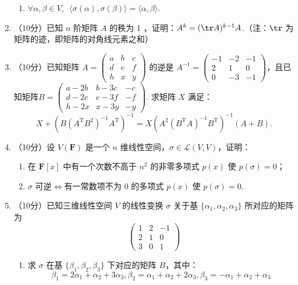 \begin{enumerate}
\begin{enumerate}
        \item $\forall \alpha,\beta \in V,\enspace \langle\sigma (\alpha),\sigma (\beta)\rangle=\langle\alpha,\beta\rangle$.
    \end{enumerate}
	\item （10分）已知 $n$ 阶矩阵 $A$ 的秩为 1 ，证明：$A^k=(\tr A)^{k-1}A$.（注：$\tr$ 为矩阵的迹，即矩阵的对角线元素之和）
	\item （10分）已知矩阵 $A=\begin{pmatrix}a & b & c \\ d & e & f \\ h & x & y\end{pmatrix}$ 的逆是 $A^{-1}=\begin{pmatrix}-1 & -2 & -1 \\ 2 & 1 & 0 \\ 0 & -3 & -1\end{pmatrix}$，且已知矩阵$B=\begin{pmatrix}a-2b & b-3c & -c \\ d-2e & e-3f & -f \\ h-2x & x-3y & -y\end{pmatrix}$. 求矩阵 $X$ 满足：
    \[X+(B(A^\mathrm{T}B^2)^{-1}A^\mathrm{T})^{-1}=X(A^2(B^\mathrm{T}A)^{-1}B^\mathrm{T})^{-1}(A+B).\]
	\item （10分）设 $V(\mathbf{F})$ 是一个 $n$ 维线性空间，$\sigma \in \mathcal{L}(V,V)$，证明：
    \begin{enumerate}
        \item 在 $\mathbf{F}[x]$ 中有一个次数不高于 $n^2$ 的非零多项式 $p(x)$ 使 $p(\sigma)=0$；

        \item $\sigma$ 可逆$\iff$有一常数项不为 0 的多项式 $p(x)$ 使 $p(\sigma)=0$.
    \end{enumerate}

\item （10分）已知三维线性空间 $V$ 的线性变换 $\sigma$ 关于基 $\{\alpha_1,\alpha_2,\alpha_3\}$ 所对应的矩阵为
    \[\begin{pmatrix}1 & 2 & -1 \\ 2 & 1 & 0 \\ 3 & 0 & 1\end{pmatrix}\]
    \begin{enumerate}
        \item 求 $\sigma$ 在基 $\{\beta_1, \beta_2, \beta_3\}$ 下对应的矩阵 $B$，其中：
        \[\beta_1=2\alpha_1+\alpha_2+3\alpha_3, \beta_2=\alpha_1+\alpha_2+2\alpha_3, \beta_3=-\alpha_1+\alpha_2+\alpha_3\]


\end{enumerate}
\end{enumerate}
